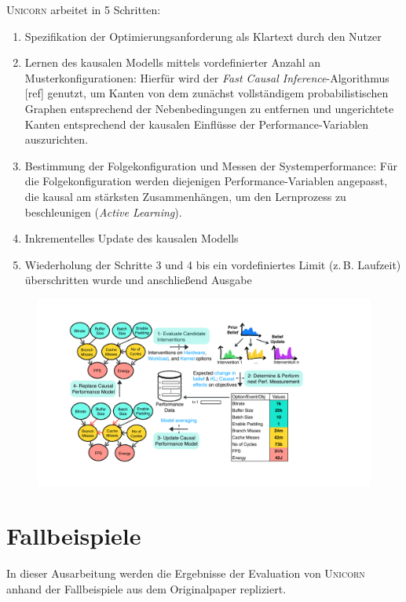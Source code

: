 \documentclass[11pt]{article}
\begin{document}
\textsc{Unicorn} arbeitet in 5 Schritten:
\begin{enumerate}
  \itemsep0em
  \item Spezifikation der Optimierungsanforderung als Klartext durch den Nutzer
  \item Lernen des kausalen Modells mittels vordefinierter Anzahl an Musterkonfigurationen: Hierfür wird der \textit{Fast Causal Inference}-Algorithmus [ref] genutzt, um Kanten von dem zunächst vollständigem probabilistischen Graphen entsprechend der Nebenbedingungen zu entfernen und ungerichtete Kanten entsprechend der kausalen Einflüsse der Performance-Variablen auszurichten.
  \item Bestimmung der Folgekonfiguration und Messen der Systemperformance: Für die Folgekonfiguration werden diejenigen Performance-Variablen angepasst, die kausal am stärksten Zusammenhängen, um den Lernprozess zu beschleunigen (\textit{Active Learning}).
  \item Inkrementelles Update des kausalen Modells
  \item Wiederholung der Schritte 3 und 4 bis ein vordefiniertes Limit (z.\,B. Laufzeit) überschritten wurde und anschließend Ausgabe
\end{enumerate}

\begin{figure}[tp!]
  \centering
  \includegraphics[width=\linewidth]{./img/Causal-Model-Update.pdf}
  \caption{\small {}}

  \label{}
\end{figure}

\section{Fallbeispiele}

In dieser Ausarbeitung werden die Ergebnisse der Evaluation von \textsc{Unicorn} anhand der Fallbeispiele aus dem Originalpaper repliziert.
\end{document}
